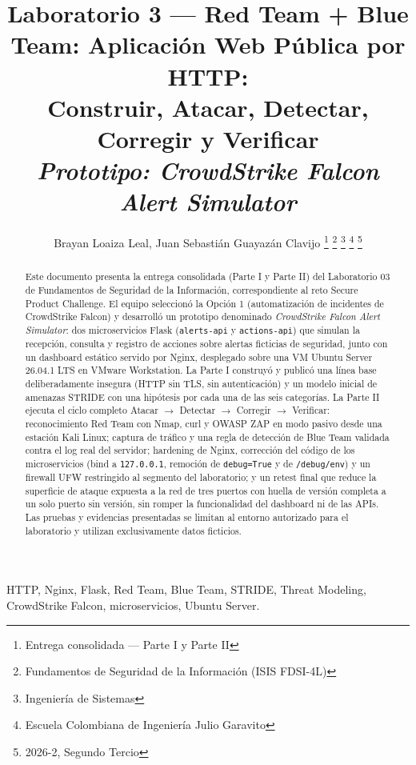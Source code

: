 \documentclass[journal]{IEEEtran}
\title{
Laboratorio 3 --- Red Team + Blue Team: Aplicación Web Pública por HTTP:\\
Construir, Atacar, Detectar, Corregir y Verificar\\
\large \textit{Prototipo: CrowdStrike Falcon Alert Simulator}
}
\author{
Brayan Loaiza Leal,
Juan Sebastián Guayazán Clavijo
\thanks{Entrega consolidada --- Parte I y Parte II}
\thanks{Fundamentos de Seguridad de la Información (ISIS FDSI-4L)}
\thanks{Ingeniería de Sistemas}
\thanks{Escuela Colombiana de Ingeniería Julio Garavito}
\thanks{2026-2, Segundo Tercio}
}
\begin{document}
\maketitle

\begin{abstract}
Este documento presenta la entrega consolidada (Parte I y Parte II) del
Laboratorio 03 de Fundamentos de Seguridad de la Información, correspondiente
al reto Secure Product Challenge. El equipo seleccionó la Opción 1
(automatización de incidentes de CrowdStrike Falcon) y desarrolló un
prototipo denominado \textit{CrowdStrike Falcon Alert Simulator}: dos
microservicios Flask (\texttt{alerts-api} y \texttt{actions-api}) que simulan
la recepción, consulta y registro de acciones sobre alertas ficticias de
seguridad, junto con un dashboard estático servido por Nginx, desplegado
sobre una VM Ubuntu Server 26.04.1 LTS en VMware Workstation. La Parte I
construyó y publicó una línea base deliberadamente insegura (HTTP sin TLS,
sin autenticación) y un modelo inicial de amenazas STRIDE con una hipótesis
por cada una de las seis categorías. La Parte II ejecuta el ciclo completo
Atacar $\rightarrow$ Detectar $\rightarrow$ Corregir $\rightarrow$ Verificar:
reconocimiento Red Team con Nmap, curl y OWASP ZAP en modo pasivo desde una
estación Kali Linux; captura de tráfico y una regla de detección de Blue Team
validada contra el log real del servidor; hardening de Nginx, corrección del
código de los microservicios (bind a \texttt{127.0.0.1}, remoción de
\texttt{debug=True} y de \texttt{/debug/env}) y un firewall UFW restringido
al segmento del laboratorio; y un retest final que reduce la superficie de
ataque expuesta a la red de tres puertos con huella de versión completa a un
solo puerto sin versión, sin romper la funcionalidad del dashboard ni de las
APIs. Las pruebas y evidencias presentadas se limitan al entorno autorizado
para el laboratorio y utilizan exclusivamente datos ficticios.
\end{abstract}

\begin{IEEEkeywords}
HTTP, Nginx, Flask, Red Team, Blue Team, STRIDE, Threat Modeling,
CrowdStrike Falcon, microservicios, Ubuntu Server.
\end{IEEEkeywords}

\IEEEpeerreviewmaketitle

\end{document}

